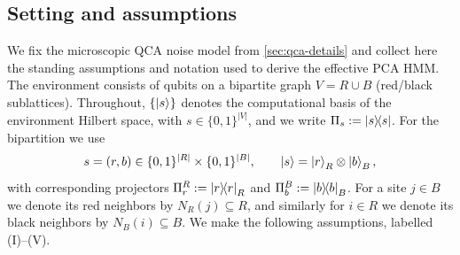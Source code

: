 \documentclass[
    aps,
    prx,
    reprint,
    superscriptaddress,
    longbibliography,
    nofootinbib,
    floatfix,
]{revtex4-2}
\newcommand{\ketbra}[2]{\ket{#1}\!\!\bra{#2}}  %
\begin{document}
\subsection{Setting and assumptions}\label{app:assumptions}
We fix the microscopic QCA noise model from \cref{sec:qca-details} and collect here the
standing assumptions and notation used to derive the effective PCA HMM.
The environment consists of qubits on a bipartite graph \(V = R \cup B\) (red/black sublattices). Throughout, \(\{\ket{s}\}\) denotes the computational basis of the environment Hilbert space, with
\(s\in\{0,1\}^{|V|}\), and we write \(\Pi_s := \ketbra{s}{s}\).
For the bipartition we use
\begin{equation}
s=(r,b)\in \{0,1\}^{|R|}\times\{0,1\}^{|B|},\qquad \ket{s}=\ket{r}_R\otimes\ket{b}_B,
\end{equation}
with corresponding projectors \(\Pi_r^R:=\ketbra{r}{r}_R\) and \(\Pi_b^B:=\ketbra{b}{b}_B\).
For a site \(j\in B\) we denote its red neighbors by \(N_R(j)\subseteq R\), and similarly
for \(i\in R\) we denote its black neighbors by \(N_B(i)\subseteq B\). We make the following assumptions, labelled (I)--(V).
\end{document}
